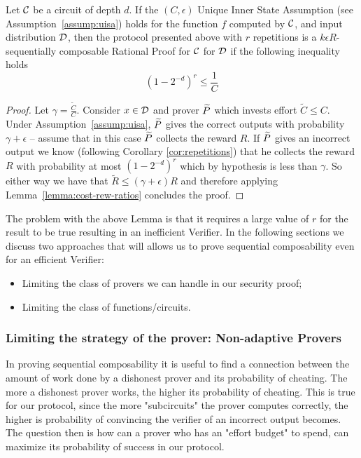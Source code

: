 \begin{lemma}
	Let $\cal{C}$ be a circuit of depth $d$. If the $(C,\epsilon)$ Unique Inner State Assumption (see Assumption~\ref{assump:uisa}) holds for the function $f$ computed by $\cal C$, and input distribution $\cal D$, then the protocol presented above with $r$ repetitions is a $k\epsilon R$-sequentially composable Rational Proof for $\cal{C}$ for $\cal D$ if the following inequality holds 
	$$ (1-2^{-d})^r \leq \frac{1}{C} $$
\end{lemma}
\begin{proof}
	Let $\gamma=\frac{\tilde{C}}{C}$. 
Consider $x \in \cal D$ and prover $\widetilde{P}$ which invests effort $\tilde{C}\leq C$. Under Assumption~\ref{assump:uisa}, $\widetilde{P}$ gives the correct outputs
with probability $\gamma+\epsilon$ -- assume that in this case $\widetilde{P}$ collects the reward $R$. If $\widetilde{P}$ gives an incorrect output we know (following Corollary \ref{cor:repetitions}) that he collects the reward 
$R$ with probability at most $(1-2^{-d})^r$ which by hypothesis is less than $\gamma$. So either way we have that $\tilde{R} \leq (\gamma + \epsilon)R$ 
and therefore applying Lemma~\ref{lemma:cost-rew-ratios} concludes the proof.
\end{proof}
The problem with the above Lemma is that it requires a large value of $r$ for the result to be true resulting in an inefficient Verifier. In the following
sections we discuss two approaches that will allows us to prove sequential composability even for an efficient Verifier:
\begin{itemize}
\item Limiting the class of provers we can handle in our security proof;
\item Limiting the class of functions/circuits.
\end{itemize}


\subsubsection{Limiting the strategy of the prover: Non-adaptive Provers}

\smallskip
\noindent
In proving sequential composability it is useful to find a connection between the amount of work done by a dishonest prover and its probability of cheating. The more a dishonest prover works, the higher its probability of cheating. This is true for our protocol, since the more "subcircuits" the prover computes correctly, the higher is probability of convincing the verifier of an incorrect output becomes. The question then is how can a prover who has an "effort budget" to spend, can maximize its probability of success in our protocol. 

